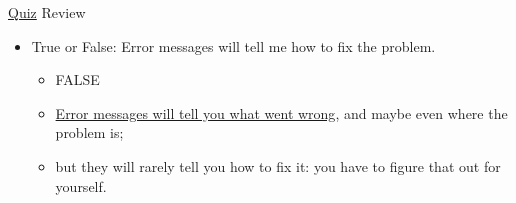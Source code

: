 \documentclass[
  11pt,
  ignorenonframetext,
]{beamer}
\providecommand{\tightlist}{%
  \setlength{\itemsep}{0pt}\setlength{\parskip}{0pt}}
\begin{document}
\begin{frame}[fragile]{\protect\hyperlink{pop-quiz}{Quiz} Review}
{\begin{itemize}
  \begin{itemize}
  \tightlist
  \item
    FALSE (trick question):
  \item
    \protect\hyperlink{warnings}{You have to figure out if a Warning can
    be safely ignored}
  \item
    An Error isn't necessarily your fault, but
    \protect\hyperlink{errors}{it does mean something happened that R
    could not handle}.
  \end{itemize}
\item
  True or False: Error messages will tell me how to fix the problem.

  \begin{itemize}
  \tightlist
  \item
    FALSE
  \item
    \protect\hyperlink{errors}{Error messages will tell you what went
    wrong}, and maybe even where the problem is;
  \item
    but they will rarely tell you how to fix it: you have to figure that
    out for yourself.
  \end{itemize}
\end{itemize}}
\end{frame}
\end{document}
